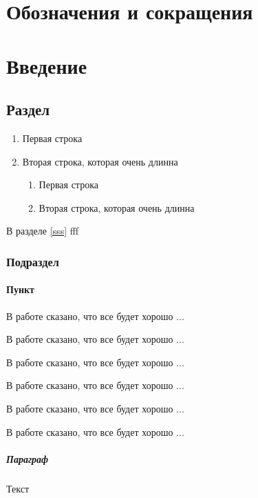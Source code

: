 \documentclass[a4paper,12pt, landscape]{report}
\begin{document}
\chapter{Обозначения и сокращения}
\chapter{Введение}

\section{Раздел}

\begin{enumerate}
 \item Первая строка

\item Вторая строка, которая очень длинна
\begin{enumerate}
 \item\label{sss} Первая строка

\item Вторая строка, которая очень длинна

\end{enumerate}

\end{enumerate}

В разделе \ref{sss} fff

\subsection{Подраздел}\label{subsection::p1}

\subsubsection{Пункт}

В работе \cite{lenin123} сказано, что все будет хорошо ...

В работе \cite{lenin123} сказано, что все будет хорошо ...

В работе \cite{lenin123} сказано, что все будет хорошо ...

В работе \cite{lenin123} сказано, что все будет хорошо ...

В работе \cite{lenin123} сказано, что все будет хорошо ...

В работе \cite{lenin123} сказано, что все будет хорошо ...


\paragraph{Параграф} Текст
\end{document}
